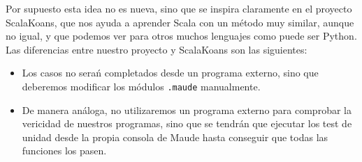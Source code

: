 Por supuesto esta idea no es nueva, sino que se inspira claramente en el proyecto ScalaKoans, que nos ayuda a aprender Scala con un método muy similar, aunque no igual, y que podemos ver para otros muchos lenguajes como puede ser Python. Las diferencias entre nuestro proyecto y ScalaKoans son las siguientes:\par
\begin{itemize}
\item Los casos no serań completados desde un programa externo, sino que deberemos modificar los módulos \texttt{.maude} manualmente.
\item De manera análoga, no utilizaremos un programa externo para comprobar la vericidad de nuestros programas, sino que se tendrán que ejecutar los test de unidad desde la propia consola de Maude hasta conseguir que todas las funciones los pasen.
\end{itemize}
